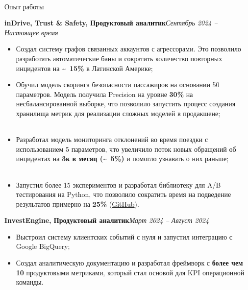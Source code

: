 \documentclass[]{mcdowellcv}
\renewenvironment{cvsubsection}[2]{%
  \begin{adjustwidth}{\subsectionmargin}{\subsectionmargin}%
    {\bfseries #1}\hfill #2\par\vspace{0.5em}%
}{%
  \end{adjustwidth}%
  \vspace*{\aftersubsectionspace}%
}
\renewcommand{\makeheader}{%
  \begin{center}
    \printname\\[0.5em]%
    \printcontacts%
  \end{center}%
  \vspace*{\afterheaderspace}%
}
\begin{document}
    \makeheader
    
    \begin{cvsection}{\Large Опыт работы}
        \begin{cvsubsection}{inDrive, Trust \& Safety, Продуктовый аналитик}{\textit{Сентябрь 2024 -- Настоящее время}}
            \begin{itemize}
                \item Создал систему графов связанных аккаунтов с агрессорами. Это позволило разработать автоматические баны и сократить количество повторных инцидентов на \textbf{\textasciitilde ~15\%} в Латинской Америке;
                \item Обучил модель скоринга безопасности пассажиров на основании 50 параметров. Модель получила Precision на уровне \textbf{30\%} на несбалансированной выборке, что позволило запустить процесс создания хранилища метрик для реализации сложных моделей в продакшене;
                \item Разработал модель мониторинга отклонений во время поездки с использованием 5 параметров, что увеличило поток новых обращений об инцидентах на \textbf{3к в месяц (\textasciitilde ~5\%)} и помогло узнавать о них раньше;
                \item Запустил более 15 экспериментов и разработал библиотеку для A/B тестирования на Python, что позволило сократить время на подведение результатов примерно на \textbf{25\%} (\href{https://github.com/Renarion/expab}{GitHub}).
            \end{itemize}
        \end{cvsubsection}
        
        \begin{cvsubsection}{InvestEngine, Продуктовый аналитик}{\textit{Март 2024 -- Август 2024}}
            \begin{itemize}
                \item Выстроил систему клиентских событий с нуля и запустил интеграцию с Google BigQuery;
                \item Создал аналитическую документацию и разработал фреймворк с \textbf{более чем 10} продуктовыми метриками, который стал основой для KPI операционной команды.
            \end{itemize}
        \end{cvsubsection}
        

\end{cvsection}
\end{document}
